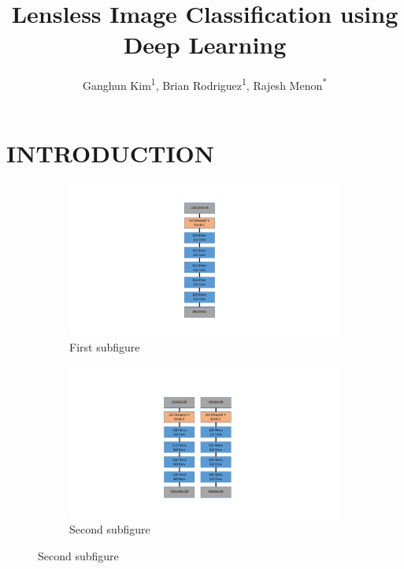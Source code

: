 \documentclass[12pt,conference]{ieeeconf}
\begin{document}
\title{Lensless Image Classification using Deep Learning}
\author{Ganghun Kim\textsuperscript{1}, Brian Rodriguez\textsuperscript{1}, Rajesh Menon\textsuperscript{*}}
\maketitle

\abstract

\section{INTRODUCTION}

\begin{figure}[t!] %
\begin{subfigure}{0.35\textwidth}
\centering
\includegraphics[width=.4\linewidth]{section1}
\caption{First subfigure} \label{fig:a}
\end{subfigure}\hspace*{\fill}
\begin{subfigure}{0.35\textwidth}
\centering
\includegraphics[width=.7\linewidth]{section2_3}
\caption{Second subfigure} \label{fig:b}
\end{subfigure}


\end{figure}
\end{document}
